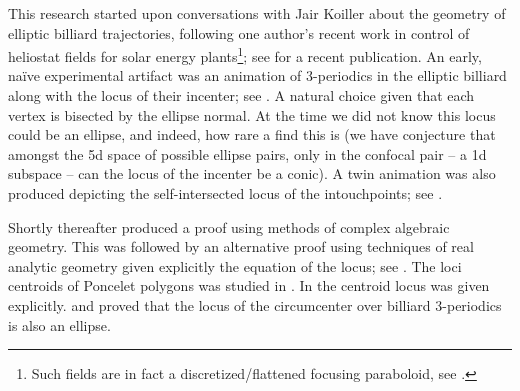 This research started upon conversations with Jair Koiller about the geometry of elliptic billiard trajectories, following one author's recent work in control of heliostat fields for solar energy plants\footnote{Such fields are in fact a discretized/flattened focusing paraboloid, see \cite{sundrop2016,esolar2017}.}; see \cite{gross2020-solar} for a recent publication. An early, naïve experimental artifact was an animation of 3-periodics in the elliptic billiard along with the locus of their incenter; see  \cite{dsr_vid11incenter}. A natural choice given that each vertex is bisected by the ellipse normal. At the time we did not know this locus could be an ellipse, and indeed, how rare a find this is (we have conjecture that amongst the 5d space of possible ellipse pairs, only in the confocal pair -- a 1d subspace -- can the locus of the incenter be a conic). A twin animation was also produced depicting the self-intersected locus of the intouchpoints; see \cite{dsr_vid11e}.

Shortly thereafter \cite{olga14} produced a proof using methods of complex algebraic geometry.
This was followed by an alternative    proof using techniques of real analytic   geometry given explicitly the equation of the locus; see \cite{garcia2019-incenter}. The loci centroids of Poncelet polygons was studied in \cite{schwartz2016-com}. In  \cite{garcia2019-incenter} the centroid locus was given explicitly.  \cite{corentin2021-circum} and \cite{garcia2018} proved that the locus of the circumcenter over billiard 3-periodics is also an ellipse.


